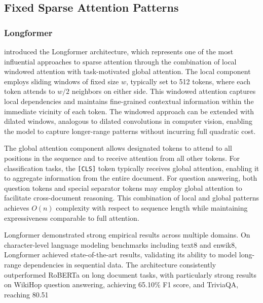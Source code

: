 \subsection{Fixed Sparse Attention Patterns}

\subsubsection{Longformer}

\citet{beltagy2020longformer} introduced the Longformer architecture, which represents one of the most influential approaches to sparse attention through the combination of local windowed attention with task-motivated global attention. The local component employs sliding windows of fixed size $w$, typically set to 512 tokens, where each token attends to $w/2$ neighbors on either side. This windowed attention captures local dependencies and maintains fine-grained contextual information within the immediate vicinity of each token. The windowed approach can be extended with dilated windows, analogous to dilated convolutions in computer vision, enabling the model to capture longer-range patterns without incurring full quadratic cost.

The global attention component allows designated tokens to attend to all positions in the sequence and to receive attention from all other tokens. For classification tasks, the \texttt{[CLS]} token typically receives global attention, enabling it to aggregate information from the entire document. For question answering, both question tokens and special separator tokens may employ global attention to facilitate cross-document reasoning. This combination of local and global patterns achieves $O(n)$ complexity with respect to sequence length while maintaining expressiveness comparable to full attention.

Longformer demonstrated strong empirical results across multiple domains. On character-level language modeling benchmarks including text8 and enwik8, Longformer achieved state-of-the-art results, validating its ability to model long-range dependencies in sequential data. The architecture consistently outperformed RoBERTa on long document tasks, with particularly strong results on WikiHop question answering, achieving 65.10\% F1 score, and TriviaQA, reaching 80.51%

